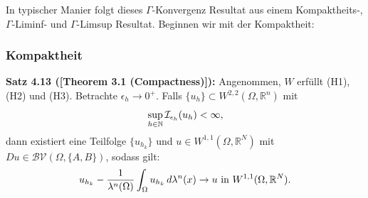 In typischer Manier folgt dieses \(\Gamma\)-Konvergenz Resultat aus einem Kompaktheits-, \(\Gamma\)-Liminf- und \(\Gamma\)-Limsup Resultat. Beginnen wir mit der Kompaktheit:
\subsubsection{Kompaktheit}
\colorbox{generalYellow}{\begin{minipage}{16cm}{\textcolor{black}{}{\label{theo4.13}}}
\textbf{Satz 4.13 (\cite{ContiTwoGradientPhase}[Theorem 3.1 (Compactness)]):} Angenommen, \(W\) erfüllt (H1), (H2) und (H3). Betrachte \(\epsilon_h \to 0^+\). Falls \(\{u_h\} \subset W^{2,2}(\Omega,\mathbb{R}^n)\) mit
\begin{equation}{\label{eq4.63}}
    \sup_{h \in \mathbb{N}} \mathcal{I}_{\epsilon_h}(u_h) < \infty,
\end{equation}
dann existiert eine Teilfolge \(\{u_{h_k}\}\) und \(u \in W^{1,1}(\Omega,\mathbb{R}^N)\) mit \(Du \in \mathcal{BV}(\Omega,\{A,B\})\), sodass gilt:
\begin{equation}{\label{eq4.64}}
    u_{h_k} - \frac{1}{\lambda^n(\Omega)} \int_{\Omega} u_{h_k} \,d\lambda^n(x) \to u \text{ in }W^{1,1}(\Omega,\mathbb{R}^N).
\end{equation}
\end{minipage}}

